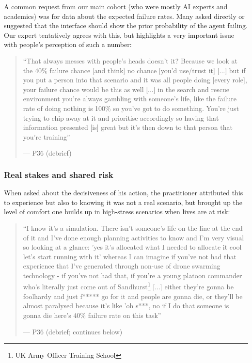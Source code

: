 A common request from our main cohort (who were mostly AI experts and academics) was for data about the expected failure rates. Many asked directly or suggested that the interface should show the prior probability of the agent failing. Our expert tentatively agrees with this, but highlights a very important issue with people's perception of such a number:
\begin{quote}\small
``That always messes with people's heads doesn't it? Because we look at the 40\% failure chance [and think] no chance [you'd use/trust it] [...] but if you put a person into that scenario and it was all people doing [every role], your failure chance would be this as well [...] in the search and rescue environment you're always gambling with someone's life, like the failure rate of doing nothing is 100\% so you've got to do something. You're just trying to chip away at it and prioritise accordingly so having that information presented [is] great but it's then down to that person that you're training''\par\hfill--- P36 (debrief)
\end{quote}

\subsubsection{Real stakes and shared risk}\label{sec:qual:practitioner:pt-shared-risk}

When asked about the decisiveness of his action, the practitioner attributed this to experience but also to knowing it was not a real scenario, but brought up the level of comfort one builds up in high-stress scenarios when lives are at risk:

\begin{quote}\small
``I know it's a simulation. There isn't someone's life on the line at the end of it and I've done enough planning activities to know and I'm very visual so looking at a glance: 'yes it's allocated what I needed to allocate it cool let's start running with it' whereas I can imagine if you've not had that experience that I've generated through non-use of drone swarming technology - if you've not had that, if you're a young platoon commander who's literally just come out of Sandhurst\footnote{UK Army Officer Training School} [...] either they're gonna be foolhardy and just f***** go for it and people are gonna die, or they'll be almost paralysed because it's like 'oh s***, no if I do that someone is gonna die here's 40\% failure rate on this task''{\color{blue}\par\hfill--- P36 (debrief; continues below)}
\end{quote}

